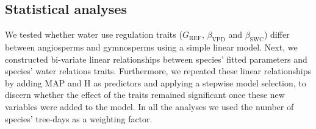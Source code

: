 \documentclass[11pt,twoside]{reedthesis}
\begin{document}
\subsection{Statistical analyses}\label{statistical-analyses}

We tested whether water use regulation traits (\(G_{\text{REF}}\),
\(\beta_{\text{VPD}}\) and \(\beta_{\text{SWC}}\)) differ between
angiosperms and gymnosperms using a simple linear model. Next, we
constructed bi-variate linear relationships between species' fitted
parameters and species' water relations traits. Furthermore, we repeated
these linear relationships by adding MAP and H as predictors and
applying a stepwise model selection, to discern whether the effect of
the traits remained significant once these new variables were added to
the model. In all the analyses we used the number of species' tree-days
as a weighting factor.\par
\end{document}
